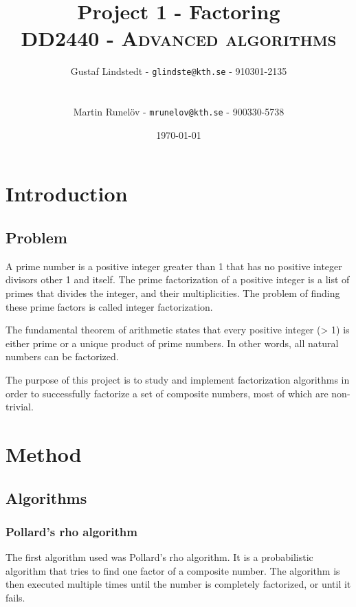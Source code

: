 \documentclass[paper=a4, fontsize=11pt,numbers=endperiod]{scrartcl} %
\title{	
\huge Project 1 - Factoring \\ %
\vspace{10pt}
\normalfont \normalsize 
\textsc{DD2440 - Advanced algorithms } \\ [25pt] %
}
\author{\vspace{-20pt} Gustaf Lindstedt - \nolinkurl{glindste@kth.se} - 910301-2135\\\\\\Martin Runelöv - \nolinkurl{mrunelov@kth.se} - 900330-5738}
\date{\vspace{8pt}\normalsize\today} %
\numberwithin{equation}{section} %
\numberwithin{figure}{section} %
\numberwithin{table}{section} %
\begin{document}
\maketitle %


\section{Introduction}

\subsection{Problem}
A prime number is a positive integer greater than 1 that has no positive integer divisors other 1 and itself. The prime factorization of a positive integer is a list of primes that divides the integer, and their multiplicities. The problem of finding these prime factors is called integer factorization.

The fundamental theorem of arithmetic states that every positive integer (> 1) is either prime or a unique product of prime numbers. In other words, all natural numbers can be factorized.

The purpose of this project is to study and implement factorization algorithms in order to successfully factorize a set of composite numbers, most of which are non-trivial.



\section{Method}
\subsection{Algorithms}
\subsubsection{Pollard's rho algorithm}
The first algorithm used was Pollard's rho algorithm\cite{pollard}. It is a probabilistic algorithm that tries to find one factor of a composite number. The algorithm is then executed multiple times until the number is completely factorized, or until it fails.
\end{document}
